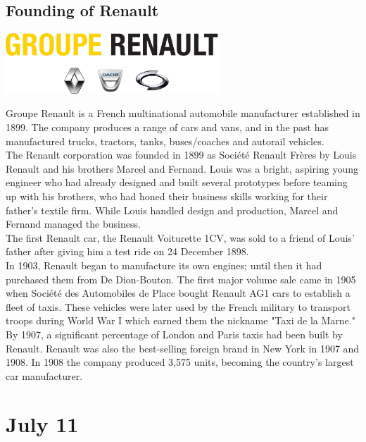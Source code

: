 \documentclass[11pt]{report}
\begin{document}
\subsection{Founding of Renault}
\vspace{2mm}\begin{center}\includegraphics[width=8cm]{./img/renaultLogo.jpg}\end{center}
Groupe Renault is a French multinational automobile manufacturer established in 1899. The company produces a range of cars and vans, and in the past has manufactured trucks, tractors, tanks, buses/coaches and autorail vehicles.\\ \indent The Renault corporation was founded in 1899 as Société Renault Frères by Louis Renault and his brothers Marcel and Fernand. Louis was a bright, aspiring young engineer who had already designed and built several prototypes before teaming up with his brothers, who had honed their business skills working for their father's textile firm. While Louis handled design and production, Marcel and Fernand managed the business.\\
\indent The first Renault car, the Renault Voiturette 1CV, was sold to a friend of Louis' father after giving him a test ride on 24 December 1898.\\ \indent In 1903, Renault began to manufacture its own engines; until then it had purchased them from De Dion-Bouton. The first major volume sale came in 1905 when Société des Automobiles de Place bought Renault AG1 cars to establish a fleet of taxis. These vehicles were later used by the French military to transport troops during World War I which earned them the nickname "Taxi de la Marne." By 1907, a significant percentage of London and Paris taxis had been built by Renault. Renault was also the best-selling foreign brand in New York in 1907 and 1908. In 1908 the company produced 3,575 units, becoming the country's largest car manufacturer.
\section{July 11}
\end{document}
